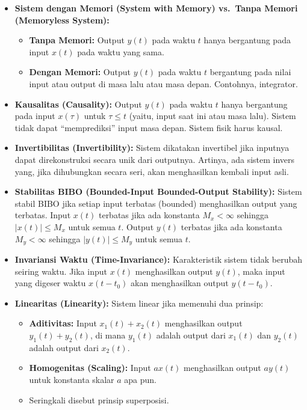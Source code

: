 \documentclass[
  letterpaper,
  DIV=11,
  numbers=noendperiod]{scrreprt}
\providecommand{\tightlist}{%
  \setlength{\itemsep}{0pt}\setlength{\parskip}{0pt}}\usepackage{longtable,booktabs,array}
\begin{document}
\begin{itemize}
\item
  \textbf{Sistem dengan Memori (System with Memory) vs.~Tanpa Memori
  (Memoryless System):}

  \begin{itemize}
  \tightlist
  \item
    \textbf{Tanpa Memori:} Output \(y(t)\) pada waktu \(t\) hanya
    bergantung pada input \(x(t)\) pada waktu yang sama.
  \item
    \textbf{Dengan Memori:} Output \(y(t)\) pada waktu \(t\) bergantung
    pada nilai input atau output di masa lalu atau masa depan.
    Contohnya, integrator.
  \end{itemize}
\item
  \textbf{Kausalitas (Causality):} Output \(y(t)\) pada waktu \(t\)
  hanya bergantung pada input \(x(\tau)\) untuk \(\tau \le t\) (yaitu,
  input saat ini atau masa lalu). Sistem tidak dapat ``memprediksi''
  input masa depan. Sistem fisik harus kausal.
\item
  \textbf{Invertibilitas (Invertibility):} Sistem dikatakan invertibel
  jika inputnya dapat direkonstruksi secara unik dari outputnya.
  Artinya, ada sistem invers yang, jika dihubungkan secara seri, akan
  menghasilkan kembali input asli.
\item
  \textbf{Stabilitas BIBO (Bounded-Input Bounded-Output Stability):}
  Sistem stabil BIBO jika setiap input terbatas (bounded) menghasilkan
  output yang terbatas. Input \(x(t)\) terbatas jika ada konstanta
  \(M_x < \infty\) sehingga \(|x(t)| \le M_x\) untuk semua \(t\). Output
  \(y(t)\) terbatas jika ada konstanta \(M_y < \infty\) sehingga
  \(|y(t)| \le M_y\) untuk semua \(t\).
\item
  \textbf{Invariansi Waktu (Time-Invariance):} Karakteristik sistem
  tidak berubah seiring waktu. Jika input \(x(t)\) menghasilkan output
  \(y(t)\), maka input yang digeser waktu \(x(t-t_0)\) akan menghasilkan
  output \(y(t-t_0)\).
\item
  \textbf{Linearitas (Linearity):} Sistem linear jika memenuhi dua
  prinsip:

  \begin{itemize}
  \tightlist
  \item
    \textbf{Aditivitas:} Input \(x_1(t)+x_2(t)\) menghasilkan output
    \(y_1(t)+y_2(t)\), di mana \(y_1(t)\) adalah output dari \(x_1(t)\)
    dan \(y_2(t)\) adalah output dari \(x_2(t)\).
  \item
    \textbf{Homogenitas (Scaling):} Input \(a x(t)\) menghasilkan output
    \(a y(t)\) untuk konstanta skalar \(a\) apa pun.
  \item
    Seringkali disebut prinsip superposisi.
  \end{itemize}
\end{itemize}
\end{document}
